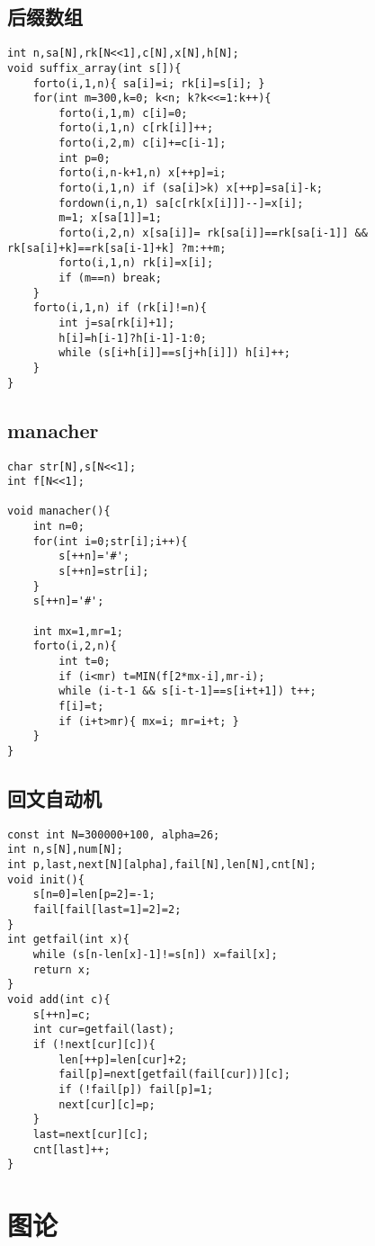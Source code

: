 \documentclass{article}
\begin{document}
\subsection{后缀数组}
\begin{lstlisting}
int n,sa[N],rk[N<<1],c[N],x[N],h[N];
void suffix_array(int s[]){
	forto(i,1,n){ sa[i]=i; rk[i]=s[i]; }
	for(int m=300,k=0; k<n; k?k<<=1:k++){
		forto(i,1,m) c[i]=0;
		forto(i,1,n) c[rk[i]]++;
		forto(i,2,m) c[i]+=c[i-1];
		int p=0;
		forto(i,n-k+1,n) x[++p]=i;
		forto(i,1,n) if (sa[i]>k) x[++p]=sa[i]-k;
		fordown(i,n,1) sa[c[rk[x[i]]]--]=x[i];
		m=1; x[sa[1]]=1;
		forto(i,2,n) x[sa[i]]= rk[sa[i]]==rk[sa[i-1]] && rk[sa[i]+k]==rk[sa[i-1]+k] ?m:++m;
		forto(i,1,n) rk[i]=x[i];
		if (m==n) break;
	}
	forto(i,1,n) if (rk[i]!=n){
		int j=sa[rk[i]+1];
		h[i]=h[i-1]?h[i-1]-1:0;
		while (s[i+h[i]]==s[j+h[i]]) h[i]++;
	}
}
\end{lstlisting}

\subsection{manacher}
\begin{lstlisting}
char str[N],s[N<<1];
int f[N<<1];

void manacher(){
	int n=0;
	for(int i=0;str[i];i++){
		s[++n]='#';
		s[++n]=str[i];
	}
	s[++n]='#';

	int mx=1,mr=1;
	forto(i,2,n){
		int t=0;
		if (i<mr) t=MIN(f[2*mx-i],mr-i);
		while (i-t-1 && s[i-t-1]==s[i+t+1]) t++;
		f[i]=t;
		if (i+t>mr){ mx=i; mr=i+t; }
	}
}
\end{lstlisting}

\subsection{回文自动机}
\begin{lstlisting}
const int N=300000+100, alpha=26;
int n,s[N],num[N];
int p,last,next[N][alpha],fail[N],len[N],cnt[N];
void init(){
	s[n=0]=len[p=2]=-1;
	fail[fail[last=1]=2]=2;
}
int getfail(int x){
	while (s[n-len[x]-1]!=s[n]) x=fail[x];
	return x;
}
void add(int c){
	s[++n]=c;
	int cur=getfail(last);
	if (!next[cur][c]){
		len[++p]=len[cur]+2;
		fail[p]=next[getfail(fail[cur])][c];
		if (!fail[p]) fail[p]=1;
		next[cur][c]=p;
	}
	last=next[cur][c];
	cnt[last]++;
}
\end{lstlisting}


\section{图论}
\end{document}
